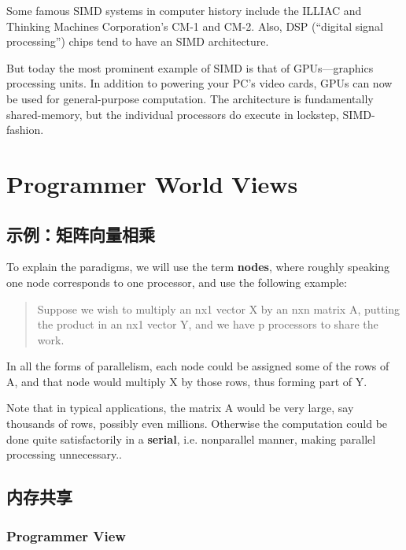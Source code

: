 Some famous SIMD systems in computer history include the ILLIAC and
Thinking Machines Corporation's CM-1 and CM-2.  Also, DSP (``digital
signal processing'') chips tend to have an SIMD architecture.

But today the most prominent example of SIMD is that of GPUs---graphics
processing units.  In addition to powering your PC's video cards, GPUs
can now be used for general-purpose computation.  The architecture is
fundamentally shared-memory, but the individual processors do execute in
lockstep, SIMD-fashion.

\section{Programmer World Views}

\subsection{示例：矩阵向量相乘}
\label{matvec}

To explain the paradigms, we will use the term \textbf{nodes}, where
roughly speaking one node corresponds to one processor, and use the
following example:

\begin{quote}

Suppose we wish to multiply an nx1 vector X by an nxn matrix A, putting
the product in an nx1 vector Y, and we have p processors to share the
work.

\end{quote}

In all the forms of parallelism, each node could be assigned some of the
rows of A, and that node would multiply X by those rows, thus forming
part of Y.

Note that in typical applications, the matrix A would be very large, say
thousands of rows, possibly even millions.  Otherwise the computation
could be done quite satisfactorily in a {\bf serial}, i.e.
nonparallel manner, making parallel processing unnecessary..

\subsection{内存共享}

\subsubsection{Programmer View}
\label{sharedview}

